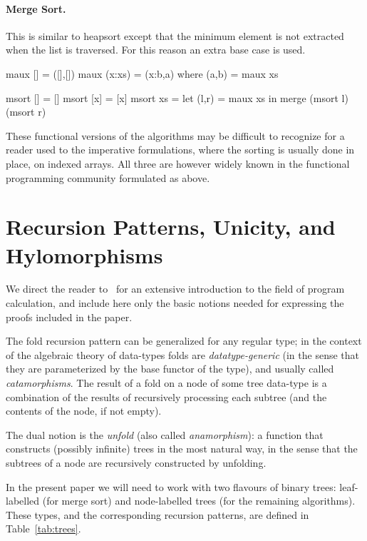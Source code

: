 \documentclass[a4paper,11pt]{llncs}
\begin{document}
\paragraph{Merge Sort.} This is similar to heapsort except that the
minimum element is not extracted when the list is traversed. For this
reason an extra base case is used.
\begin{code}
maux []     = ([],[])
maux (x:xs) = (x:b,a)  where (a,b) = maux xs

msort []  = []
msort [x] = [x]
msort xs  = let (l,r) = maux xs
            in merge (msort l) (msort r)
\end{code}

These functional versions of the algorithms may be difficult to
recognize for a reader used to the imperative formulations, where the
sorting is usually done in place, on indexed arrays. All three are
however widely known in the functional programming community
formulated as above.


\section{Recursion Patterns, Unicity, and Hylomorphisms}
\label{sec:bacsah}

We direct the reader to~\cite{GibbonsJ:calfp} for an extensive
introduction to the field of program calculation, and include here
only the basic notions needed for expressing the proofs included in
the paper.

The fold recursion pattern can be generalized for any regular type; in
the context of the algebraic theory of data-types folds are
\emph{datatype-generic} (in the sense that they are parameterized by
the base functor of the type), and usually called
\emph{catamorphisms}.  The result of a fold on a node of some tree
data-type is a combination of the results of recursively processing
each subtree (and the contents of the node, if not empty).

The dual notion is the \emph{unfold} (also called \emph{anamorphism}):
a function that constructs (possibly infinite) trees in the most
natural way, in the sense that the subtrees of a node are recursively
constructed by unfolding.

In the present paper we will need to work with two flavours of binary
trees: leaf-labelled (for merge sort) and node-labelled trees (for the
remaining algorithms). These types, and the corresponding recursion
patterns, are defined in Table~\ref{tab:trees}.
\end{document}
